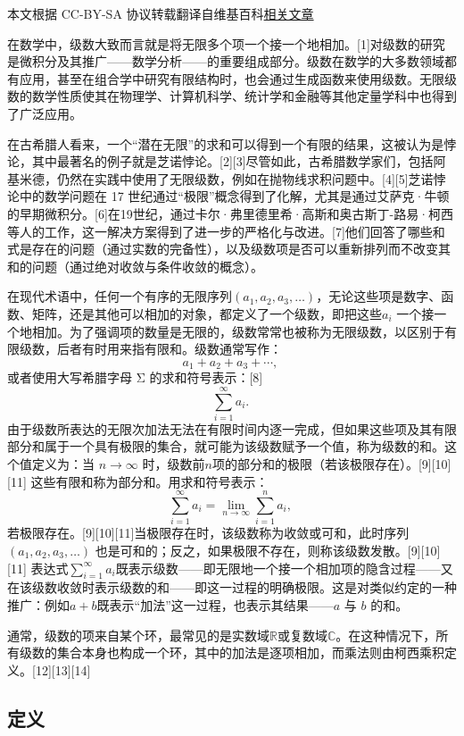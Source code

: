 
本文根据 CC-BY-SA 协议转载翻译自维基百科\href{https://en.wikipedia.org/wiki/Series_(mathematics)}{相关文章}

在数学中，级数大致而言就是将无限多个项一个接一个地相加。[1]对级数的研究是微积分及其推广——数学分析——的重要组成部分。级数在数学的大多数领域都有应用，甚至在组合学中研究有限结构时，也会通过生成函数来使用级数。无限级数的数学性质使其在物理学、计算机科学、统计学和金融等其他定量学科中也得到了广泛应用。

在古希腊人看来，一个“潜在无限”的求和可以得到一个有限的结果，这被认为是悖论，其中最著名的例子就是芝诺悖论。[2][3]尽管如此，古希腊数学家们，包括阿基米德，仍然在实践中使用了无限级数，例如在抛物线求积问题中。[4][5]芝诺悖论中的数学问题在 17 世纪通过“极限”概念得到了化解，尤其是通过艾萨克·牛顿的早期微积分。[6]在19世纪，通过卡尔·弗里德里希·高斯和奥古斯丁-路易·柯西等人的工作，这一解决方案得到了进一步的严格化与改进。[7]他们回答了哪些和式是存在的问题（通过实数的完备性），以及级数项是否可以重新排列而不改变其和的问题（通过绝对收敛与条件收敛的概念）。

在现代术语中，任何一个有序的无限序列$(a_{1}, a_{2}, a_{3}, \ldots)$，无论这些项是数字、函数、矩阵，还是其他可以相加的对象，都定义了一个级数，即把这些$a_i$ 一个接一个地相加。为了强调项的数量是无限的，级数常常也被称为无限级数，以区别于有限级数，后者有时用来指有限和。级数通常写作：
$$
a_{1} + a_{2} + a_{3} + \cdots ,~
$$
或者使用大写希腊字母 Σ 的求和符号表示：[8]
$$
\sum_{i=1}^{\infty} a_i .~
$$
由于级数所表达的无限次加法无法在有限时间内逐一完成，但如果这些项及其有限部分和属于一个具有极限的集合，就可能为该级数赋予一个值，称为级数的和。这个值定义为：当 $n \to \infty$ 时，级数前$n$项的部分和的极限（若该极限存在）。[9][10][11] 这些有限和称为部分和。用求和符号表示：
$$
\sum_{i=1}^{\infty} a_i = \lim_{n \to \infty} \sum_{i=1}^{n} a_i ,~
$$
若极限存在。[9][10][11]当极限存在时，该级数称为收敛或可和，此时序列$(a_{1}, a_{2}, a_{3}, \ldots)$ 也是可和的；反之，如果极限不存在，则称该级数发散。[9][10][11]
表达式$\sum_{i=1}^{\infty} a_{i}$既表示级数——即无限地一个接一个相加项的隐含过程——又在该级数收敛时表示级数的和——即这一过程的明确极限。这是对类似约定的一种推广：例如$a+b$既表示“加法”这一过程，也表示其结果——$a$ 与 $b$ 的和。

通常，级数的项来自某个环，最常见的是实数域$\mathbb{R}$或复数域$\mathbb{C}$。在这种情况下，所有级数的集合本身也构成一个环，其中的加法是逐项相加，而乘法则由柯西乘积定义。[12][13][14]
\subsection{定义}

